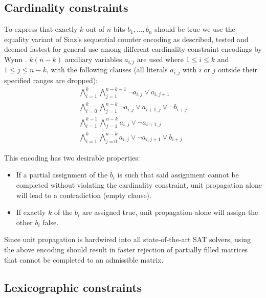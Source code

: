 \documentclass[10pt,a4paper]{article}
\theoremstyle{definition}
\begin{document}
	\subsection{Cardinality constraints}
	
	To express that exactly $k$ out of $n$ bits $b_1,\dots,b_n$ should be true we use the equality variant of Sinz's sequential counter encoding \cite{sinz} as described, tested and deemed fastest for general use among different cardinality constraint encodings by Wynn \cite{cardconstraint}. $k(n-k)$ auxiliary variables $a_{i,j}$ are used where $1\le i\le k$ and $1\le j\le n-k$, with the following clauses (all literals $a_{i,j}$ with $i$ or $j$ outside their specified ranges are dropped):
	\begin{gather*}
		\bigwedge_{i=1}^k\bigwedge_{j=1}^{n-k-1}\neg a_{i,j}\lor a_{i,j+1}\\
		\bigwedge_{i=0}^k\bigwedge_{j=1}^{n-k}\neg a_{i,j}\lor a_{i+1,j}\lor\neg b_{i+j}\\
		\bigwedge_{i=1}^{k-1}\bigwedge_{j=1}^{n-k}a_{i,j}\lor\neg a_{i+1,j}\\
		\bigwedge_{i=1}^k\bigwedge_{j=0}^{n-k}a_{i,j}\lor\neg a_{i,j+1}\lor b_{i+j}
	\end{gather*}
	
	This encoding has two desirable properties:
	\begin{itemize}
		\item If a partial assignment of the $b_i$ is such that said assignment cannot be completed without violating the cardinality constraint, unit propagation alone will lead to a contradiction (empty clause).
		\item If exactly $k$ of the $b_i$ are assigned true, unit propagation alone will assign the other $b_i$ false.
	\end{itemize}
	
	Since unit propagation is hardwired into all state-of-the-art SAT solvers, using the above encoding should result in faster rejection of partially filled matrices that cannot be completed to an admissible matrix.
	
	\subsection{Lexicographic constraints}
	
\end{document}
